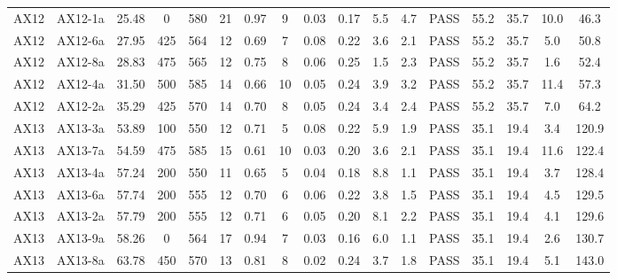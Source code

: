 \documentclass[9pt,twoside,lineno]{pnas-new}
\begin{document}
\begin{table}
\begin{tabular}{ccccccccccccccccc}
AX12 & AX12-1a  & 25.48     & 0         & 580       & 21 & 0.97 & 9     & 0.03    & 0.17    & 5.5            & 4.7             & PASS & 55.2       & 35.7          & 10.0     & 46.3          \\
AX12 & AX12-6a  & 27.95     & 425       & 564       & 12 & 0.69 & 7     & 0.08    & 0.22    & 3.6            & 2.1             & PASS & 55.2       & 35.7          & 5.0      & 50.8          \\
AX12 & AX12-8a  & 28.83     & 475       & 565       & 12 & 0.75 & 8     & 0.06    & 0.25    & 1.5            & 2.3             & PASS & 55.2       & 35.7          & 1.6      & 52.4          \\
AX12 & AX12-4a  & 31.50     & 500       & 585       & 14 & 0.66 & 10    & 0.05    & 0.24    & 3.9            & 3.2             & PASS & 55.2       & 35.7          & 11.4     & 57.3          \\
AX12 & AX12-2a  & 35.29     & 425       & 570       & 14 & 0.70 & 8     & 0.05    & 0.24    & 3.4            & 2.4             & PASS & 55.2       & 35.7          & 7.0      & 64.2          \\
AX13 & AX13-3a  & 53.89     & 100       & 550       & 12 & 0.71 & 5     & 0.08    & 0.22    & 5.9            & 1.9             & PASS & 35.1       & 19.4          & 3.4      & 120.9         \\
AX13 & AX13-7a  & 54.59     & 475       & 585       & 15 & 0.61 & 10    & 0.03    & 0.20    & 3.6            & 2.1             & PASS & 35.1       & 19.4          & 11.6     & 122.4         \\
AX13 & AX13-4a  & 57.24     & 200       & 550       & 11 & 0.65 & 5     & 0.04    & 0.18    & 8.8            & 1.1             & PASS & 35.1       & 19.4          & 3.7      & 128.4         \\
AX13 & AX13-6a  & 57.74     & 200       & 555       & 12 & 0.70 & 6     & 0.06    & 0.22    & 3.8            & 1.5             & PASS & 35.1       & 19.4          & 4.5      & 129.5         \\
AX13 & AX13-2a  & 57.79     & 200       & 555       & 12 & 0.71 & 6     & 0.05    & 0.20    & 8.1            & 2.2             & PASS & 35.1       & 19.4          & 4.1      & 129.6         \\
AX13 & AX13-9a  & 58.26     & 0         & 564       & 17 & 0.94 & 7     & 0.03    & 0.16    & 6.0            & 1.1             & PASS & 35.1       & 19.4          & 2.6      & 130.7         \\
AX13 & AX13-8a  & 63.78     & 450       & 570       & 13 & 0.81 & 8     & 0.02    & 0.24    & 3.7            & 1.8             & PASS & 35.1       & 19.4          & 5.1      & 143.0         \\

\end{tabular}
\end{table}
\end{document}
